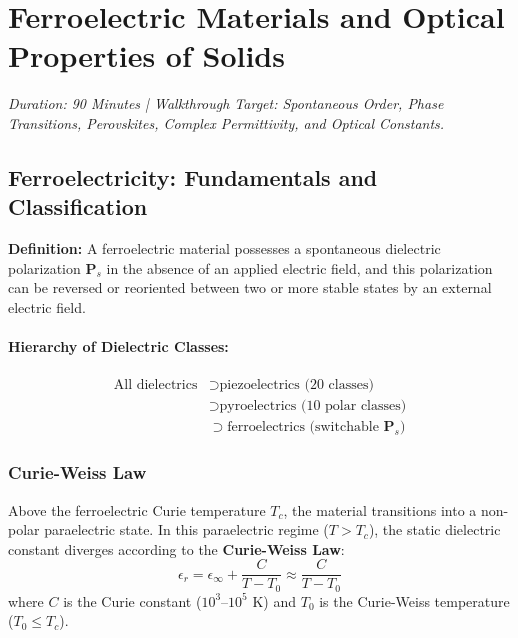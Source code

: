 \documentclass[11pt,a4paper]{article}
\begin{document}
\newpage
\section{Ferroelectric Materials and Optical Properties of Solids}
\label{sec:ferroelectrics_optics}


\textit{Duration: 90 Minutes \quad | \quad Walkthrough Target: Spontaneous Order, Phase Transitions, Perovskites, Complex Permittivity, and Optical Constants.}

\subsection{Ferroelectricity: Fundamentals and Classification}
\textbf{Definition:} A ferroelectric material possesses a spontaneous dielectric polarization $\mathbf{P}_s$ in the absence of an applied electric field, and this polarization can be reversed or reoriented between two or more stable states by an external electric field.

\paragraph{Hierarchy of Dielectric Classes:}
\begin{equation}
    \begin{aligned}
    \text{All dielectrics} &\supset \text{piezoelectrics (20 classes)} \\
    &\supset \text{pyroelectrics (10 polar classes)} \\
    &\supset \text{ferroelectrics (switchable } \mathbf{P}_s\text{)}
    \end{aligned}
\end{equation}

\subsubsection{Curie-Weiss Law}
Above the ferroelectric Curie temperature $T_c$, the material transitions into a non-polar paraelectric state. In this paraelectric regime ($T > T_c$), the static dielectric constant diverges according to the \textbf{Curie-Weiss Law}:
\begin{equation}
    \epsilon_r = \epsilon_\infty + \frac{C}{T - T_0} \approx \frac{C}{T - T_0}
\end{equation}
where $C$ is the Curie constant ($10^3$--$10^5\text{ K}$) and $T_0$ is the Curie-Weiss temperature ($T_0 \le T_c$).
\end{document}
